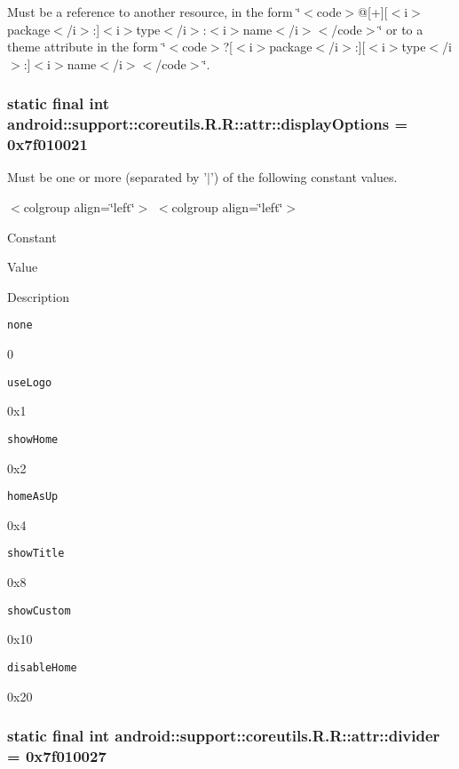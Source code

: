 Must be a reference to another resource, in the form \char`\"{}$<$code$>$@\mbox{[}+\mbox{]}\mbox{[}$<$i$>$package$<$/i$>$:\mbox{]}$<$i$>$type$<$/i$>$:$<$i$>$name$<$/i$>$$<$/code$>$\char`\"{} or to a theme attribute in the form \char`\"{}$<$code$>$?\mbox{[}$<$i$>$package$<$/i$>$:\mbox{]}\mbox{[}$<$i$>$type$<$/i$>$:\mbox{]}$<$i$>$name$<$/i$>$$<$/code$>$\char`\"{}. \hypertarget{classandroid_1_1support_1_1coreutils_1_1_r_1_1attr_6e125a106b7eb84cbac6e1ba2bbf79e7}{
\subsubsection[{displayOptions}]{\setlength{\rightskip}{0pt plus 5cm}static final int android::support::coreutils.R.R::attr::displayOptions = 0x7f010021}}
\label{classandroid_1_1support_1_1coreutils_1_1_r_1_1attr_6e125a106b7eb84cbac6e1ba2bbf79e7}


Must be one or more (separated by '$|$') of the following constant values. \begin{TabularC}{0}
\hline
\end{TabularC}
$<$colgroup align=\char`\"{}left\char`\"{}$>$ $<$colgroup align=\char`\"{}left\char`\"{}$>$ 

Constant

Value

Description 

{\tt none}

0

{\tt useLogo}

0x1

{\tt showHome}

0x2

{\tt homeAsUp}

0x4

{\tt showTitle}

0x8

{\tt showCustom}

0x10

{\tt disableHome}

0x20\hypertarget{classandroid_1_1support_1_1coreutils_1_1_r_1_1attr_363df77a1e84707c4607532840bba6e0}{
\subsubsection[{divider}]{\setlength{\rightskip}{0pt plus 5cm}static final int android::support::coreutils.R.R::attr::divider = 0x7f010027}}
\label{classandroid_1_1support_1_1coreutils_1_1_r_1_1attr_363df77a1e84707c4607532840bba6e0}



